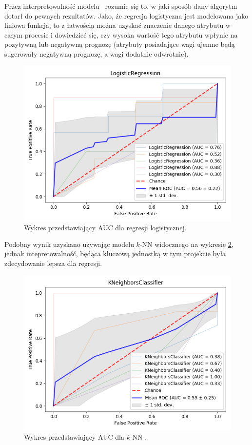 \documentclass[a4paper,twoside,12pt]{book}
\begin{document}
Przez interpretowalność modelu~\cite{interpr} rozumie się to, w jaki sposób dany algorytm dotarł do pewnych rezultatów. Jako, że regresja logistyczna jest modelowana jako liniowa funkcja, to z łatwością można uzyskać znaczenie danego atrybutu w całym procesie i dowiedzieć się, czy wysoka wartość tego atrybutu wpłynie na pozytywną lub negatywną prognozę (atrybuty posiadające wagi ujemne będą sugerowały negatywną prognozę, a wagi dodatnie odwrotnie). 

\begin{figure}[h!]
    \centering
    \includegraphics[width=\textwidth]{images/logistic_regression.png}
    \caption{Wykres przedstawiający AUC dla regresji logistycznej.}
    \label{fig:plot_logit}
\end{figure}

Podobny wynik uzyskano używając modelu $k$-NN widocznego na wykresie \ref{fig:plot_knn}, jednak intepretowalność, będąca kluczową jednostką w tym projekcie była zdecydowanie lepsza dla regresji. 
\begin{figure}[h!]
    \centering
    \includegraphics[width=\textwidth]{images/knn.png}
    \caption{Wykres przedstawiający AUC dla $k$-NN .}
    \label{fig:plot_knn}
\end{figure}
\end{document}
